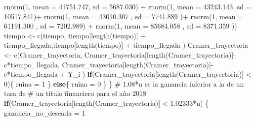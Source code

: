\documentclass[
  us-letterpaper,
]{scrreprt}
\newenvironment{Shaded}{\begin{snugshade}}{\end{snugshade}}
\newcommand{\AttributeTok}[1]{\textcolor[rgb]{0.40,0.45,0.13}{#1}}
\newcommand{\CommentTok}[1]{\textcolor[rgb]{0.37,0.37,0.37}{#1}}
\newcommand{\ControlFlowTok}[1]{\textcolor[rgb]{0.00,0.23,0.31}{\textbf{#1}}}
\newcommand{\DecValTok}[1]{\textcolor[rgb]{0.68,0.00,0.00}{#1}}
\newcommand{\FloatTok}[1]{\textcolor[rgb]{0.68,0.00,0.00}{#1}}
\newcommand{\FunctionTok}[1]{\textcolor[rgb]{0.28,0.35,0.67}{#1}}
\newcommand{\NormalTok}[1]{\textcolor[rgb]{0.00,0.23,0.31}{#1}}
\newcommand{\OtherTok}[1]{\textcolor[rgb]{0.00,0.23,0.31}{#1}}
\newcommand{\SpecialCharTok}[1]{\textcolor[rgb]{0.37,0.37,0.37}{#1}}
\theoremstyle{plain}
\theoremstyle{plain}
\theoremstyle{definition}
\theoremstyle{remark}
\begin{document}
\begin{Shaded}
\begin{Highlighting}[]
               \FunctionTok{rnorm}\NormalTok{(}\DecValTok{1}\NormalTok{, }\AttributeTok{mean =}   \FloatTok{41751.747}\NormalTok{, }\AttributeTok{sd =} \FloatTok{5687.030}\NormalTok{) }\SpecialCharTok{+} 
               \FunctionTok{rnorm}\NormalTok{(}\DecValTok{1}\NormalTok{, }\AttributeTok{mean =}   \FloatTok{43243.143}\NormalTok{, }\AttributeTok{sd =} \FloatTok{10517.841}\NormalTok{)}\SpecialCharTok{+} 
               \FunctionTok{rnorm}\NormalTok{(}\DecValTok{1}\NormalTok{, }\AttributeTok{mean =} \FloatTok{43010.307}\NormalTok{  , }\AttributeTok{sd =} \FloatTok{7741.889}\NormalTok{ )}\SpecialCharTok{+}
               \FunctionTok{rnorm}\NormalTok{(}\DecValTok{1}\NormalTok{, }\AttributeTok{mean =} \FloatTok{61191.300}\NormalTok{  , }\AttributeTok{sd =} \FloatTok{7202.989}\NormalTok{) }\SpecialCharTok{+}
               \FunctionTok{rnorm}\NormalTok{(}\DecValTok{1}\NormalTok{, }\AttributeTok{mean =}  \FloatTok{85684.058}\NormalTok{ , }\AttributeTok{sd =} \FloatTok{8371.359}\NormalTok{ )) }
\NormalTok{    tiempo }\OtherTok{\textless{}{-}} \FunctionTok{c}\NormalTok{(tiempo, tiempo[}\FunctionTok{length}\NormalTok{(tiempo)] }\SpecialCharTok{+}
\NormalTok{                  tiempo\_llegada,tiempo[}\FunctionTok{length}\NormalTok{(tiempo)] }\SpecialCharTok{+} 
\NormalTok{                  tiempo\_llegada ) }
\NormalTok{    Cramer\_trayectoria }\OtherTok{\textless{}{-}} \FunctionTok{c}\NormalTok{(Cramer\_trayectoria,}
\NormalTok{                       Cramer\_trayectoria[}\FunctionTok{length}\NormalTok{(Cramer\_trayectoria)]}\SpecialCharTok{{-}}
\NormalTok{                          c}\SpecialCharTok{*}\NormalTok{tiempo\_llegada, }
\NormalTok{                       Cramer\_trayectoria[}\FunctionTok{length}\NormalTok{(Cramer\_trayectoria)]}\SpecialCharTok{{-}}
\NormalTok{                         c}\SpecialCharTok{*}\NormalTok{tiempo\_llegada }\SpecialCharTok{+}\NormalTok{  Y\_i )}
    \ControlFlowTok{if}\NormalTok{(Cramer\_trayectoria[}\FunctionTok{length}\NormalTok{(Cramer\_trayectoria)] }\SpecialCharTok{\textless{}} \DecValTok{0}\NormalTok{)\{}
\NormalTok{      ruina }\OtherTok{=} \DecValTok{1}
\NormalTok{    \}}
    \ControlFlowTok{else}\NormalTok{\{}
\NormalTok{      ruina }\OtherTok{=} \DecValTok{0}
\NormalTok{    \}}
\NormalTok{  \}}
\CommentTok{\# 1.08*u es la ganancia inferior a la de un tasa de }
\CommentTok{\# un título financiero para el año 2018}
  \ControlFlowTok{if}\NormalTok{(Cramer\_trayectoria[}\FunctionTok{length}\NormalTok{(Cramer\_trayectoria)] }\SpecialCharTok{\textless{}} \FloatTok{1.02333}\SpecialCharTok{*}\NormalTok{u) \{}
\NormalTok{    ganancia\_no\_deseada }\OtherTok{=} \DecValTok{1}
    

\end{Highlighting}
\end{Shaded}
\end{document}
